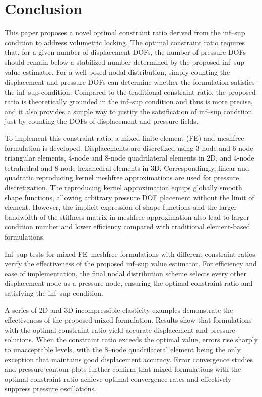 \section{Conclusion}

This paper proposes a novel optimal constraint ratio derived from the inf--sup condition to address volumetric locking. The optimal constraint ratio requires that, for a given number of displacement DOFs, the number of pressure DOFs should remain below a stabilized number determined by the proposed inf--sup value estimator. For a well-posed nodal distribution, simply counting the displacement and pressure DOFs can determine whether the formulation satisfies the inf--sup condition. Compared to the traditional constraint ratio, the proposed ratio is theoretically grounded in the inf--sup condition and thus is more precise,
and it also provides a simple way to justify the satsification of inf--sup condtiion just by counting the DOFs of displacement and pressure fields.

To implement this constraint ratio, a mixed finite element (FE) and meshfree formulation is developed. Displacements are discretized using 3-node and 6-node triangular elements, 4-node and 8-node quadrilateral elements in 2D, and 4-node tetrahedral and 8-node hexahedral elements in 3D. Correspondingly, linear and quadratic reproducing kernel meshfree approximations are used for pressure discretization. The reproducing kernel approximation equips globally smooth shape functions, allowing arbitrary pressure DOF placement without the limit of element.
However, the implicit expression of shape functions and the larger bandwidth of the stiffness matrix in meshfree approximation also lead to larger condition number and lower efficiency compared with traditional element-based formulations.

Inf--sup tests for mixed FE--meshfree formulations with different constraint ratios verify the effectiveness of the proposed inf--sup value estimator. For efficiency and ease of implementation, the final nodal distribution scheme selects every other displacement node as a pressure node, ensuring the optimal constraint ratio and satisfying the inf--sup condition.

A series of 2D and 3D incompressible elasticity examples demonstrate the effectiveness of the proposed mixed formulation. Results show that formulations with the optimal constraint ratio yield accurate displacement and pressure solutions. When the constraint ratio exceeds the optimal value, errors rise sharply to unacceptable levels, with the 8--node quadrilateral element being the only exception that maintains good displacement accuracy. Error convergence studies and pressure contour plots further confirm that mixed formulations with the optimal constraint ratio achieve optimal convergence rates and effectively suppress pressure oscillations.
